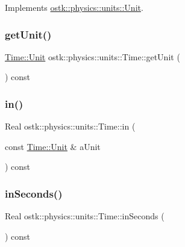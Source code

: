 Implements \hyperlink{classostk_1_1physics_1_1units_1_1_unit_ab203628f8a16b16c28d89eaa4c3aff67}{ostk\+::physics\+::units\+::\+Unit}.

\mbox{\label{classostk_1_1physics_1_1units_1_1_time_a2e6a342d3c8b7ee85764223855056fb0}} 
\subsubsection{\texorpdfstring{get\+Unit()}{getUnit()}}
{\footnotesize\ttfamily \hyperlink{classostk_1_1physics_1_1units_1_1_time_aa961f0dbca7ec297e19e15e0dfa3bb4a}{Time\+::\+Unit} ostk\+::physics\+::units\+::\+Time\+::get\+Unit (\begin{DoxyParamCaption}{ }\end{DoxyParamCaption}) const}

\mbox{\label{classostk_1_1physics_1_1units_1_1_time_a222edb0c7de6cfbc5ae29632261bc829}} 
\subsubsection{\texorpdfstring{in()}{in()}}
{\footnotesize\ttfamily Real ostk\+::physics\+::units\+::\+Time\+::in (\begin{DoxyParamCaption}\item[{const \hyperlink{classostk_1_1physics_1_1units_1_1_time_aa961f0dbca7ec297e19e15e0dfa3bb4a}{Time\+::\+Unit} \&}]{a\+Unit }\end{DoxyParamCaption}) const}

\mbox{\label{classostk_1_1physics_1_1units_1_1_time_afbb52cb65acea3748fdd1952fc9d81ee}} 
\subsubsection{\texorpdfstring{in\+Seconds()}{inSeconds()}}
{\footnotesize\ttfamily Real ostk\+::physics\+::units\+::\+Time\+::in\+Seconds (\begin{DoxyParamCaption}{ }\end{DoxyParamCaption}) const}


